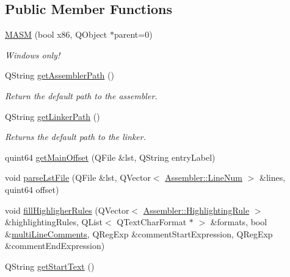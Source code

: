 \subsection*{Public Member Functions}
\begin{DoxyCompactItemize}
\item 
\hypertarget{class_m_a_s_m_a3dfd4e74baa50b2f7f71c0b1f4f0679f}{}\hyperlink{class_m_a_s_m_a3dfd4e74baa50b2f7f71c0b1f4f0679f}{M\+A\+S\+M} (bool x86, Q\+Object $\ast$parent=0)\label{class_m_a_s_m_a3dfd4e74baa50b2f7f71c0b1f4f0679f}

\begin{DoxyCompactList}\small\item\em Windows only! \end{DoxyCompactList}\item 
\hypertarget{class_m_a_s_m_a22a46b8c03783623be35dc7bb01d3d19}{}Q\+String \hyperlink{class_m_a_s_m_a22a46b8c03783623be35dc7bb01d3d19}{get\+Assembler\+Path} ()\label{class_m_a_s_m_a22a46b8c03783623be35dc7bb01d3d19}

\begin{DoxyCompactList}\small\item\em Return the default path to the assembler. \end{DoxyCompactList}\item 
\hypertarget{class_m_a_s_m_aefccdd4c6d400917163cdd6008e036ff}{}Q\+String \hyperlink{class_m_a_s_m_aefccdd4c6d400917163cdd6008e036ff}{get\+Linker\+Path} ()\label{class_m_a_s_m_aefccdd4c6d400917163cdd6008e036ff}

\begin{DoxyCompactList}\small\item\em Returns the default path to the linker. \end{DoxyCompactList}\item 
quint64 \hyperlink{class_m_a_s_m_aef0f1a5915184bfb9aca890a3493b3ad}{get\+Main\+Offset} (Q\+File \&lst, Q\+String entry\+Label)
\item 
void \hyperlink{class_m_a_s_m_ad52eca298e722cee1e547f62ae24ee11}{parse\+Lst\+File} (Q\+File \&lst, Q\+Vector$<$ \hyperlink{struct_assembler_1_1_line_num}{Assembler\+::\+Line\+Num} $>$ \&lines, quint64 offset)
\item 
void \hyperlink{class_m_a_s_m_a946690c33e0a66a0a91acd857870ffdb}{fill\+Highligher\+Rules} (Q\+Vector$<$ \hyperlink{struct_assembler_1_1_highlighting_rule}{Assembler\+::\+Highlighting\+Rule} $>$ \&highlighting\+Rules, Q\+List$<$ Q\+Text\+Char\+Format $\ast$ $>$ \&formats, bool \&\hyperlink{class_assembler_a8e2ae531c6d59dfea8c7bb90febda262}{multi\+Line\+Comments}, Q\+Reg\+Exp \&comment\+Start\+Expression, Q\+Reg\+Exp \&comment\+End\+Expression)
\item 
\hypertarget{class_m_a_s_m_a9d4eb3151e7082a98db1717203d0835c}{}Q\+String \hyperlink{class_m_a_s_m_a9d4eb3151e7082a98db1717203d0835c}{get\+Start\+Text} ()\label{class_m_a_s_m_a9d4eb3151e7082a98db1717203d0835c}


\end{DoxyCompactItemize}
